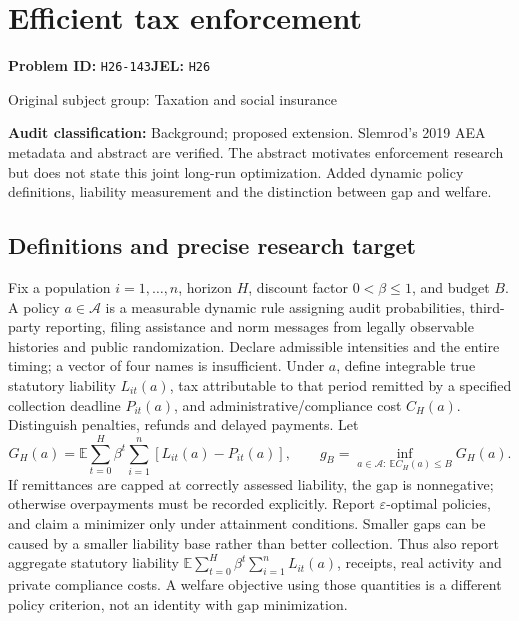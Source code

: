 \documentclass[11pt,a4paper]{article}
\begin{document}
\section*{Efficient tax enforcement}
\textbf{Problem ID:} \texttt{H26-143}\quad \textbf{JEL:} \texttt{H26}\par
\label{problem:OP-0477}
\label{audited:ECON-088}
{\sffamily\small\color{muted}Original subject group: Taxation and social insurance\par}
\label{definitions:problem:30007759}
\textbf{Audit classification:} Background; proposed extension. Slemrod’s 2019 AEA metadata and abstract are verified. The abstract motivates enforcement research but does not state this joint long-run optimization. Added dynamic policy definitions, liability measurement and the distinction between gap and welfare.
\subsection*{Definitions and precise research target}
Fix a population \(i=1,\ldots,n\), horizon \(H\), discount factor \(0<\beta\leq1\), and budget \(B\). A policy \(a\in\mathcal A\) is a measurable dynamic rule assigning audit probabilities, third-party reporting, filing assistance and norm messages from legally observable histories and public randomization. Declare admissible intensities and the entire timing; a vector of four names is insufficient. Under \(a\), define integrable true statutory liability \(L_{it}(a)\), tax attributable to that period remitted by a specified collection deadline \(P_{it}(a)\), and administrative/compliance cost \(C_H(a)\). Distinguish penalties, refunds and delayed payments. Let
\[
 G_H(a)=\mathbb E\sum_{t=0}^H\beta^t\sum_{i=1}^n[L_{it}(a)-P_{it}(a)],
 \qquad g_B=\inf_{a\in\mathcal A:\ \mathbb E C_H(a)\leq B}G_H(a).
\]
If remittances are capped at correctly assessed liability, the gap is nonnegative; otherwise overpayments must be recorded explicitly. Report \(\varepsilon\)-optimal policies, and claim a minimizer only under attainment conditions. Smaller gaps can be caused by a smaller liability base rather than better collection. Thus also report aggregate statutory liability \(\mathbb E\sum_{t=0}^H\beta^t\sum_{i=1}^nL_{it}(a)\), receipts, real activity and private compliance costs. A welfare objective using those quantities is a different policy criterion, not an identity with gap minimization.
\end{document}
